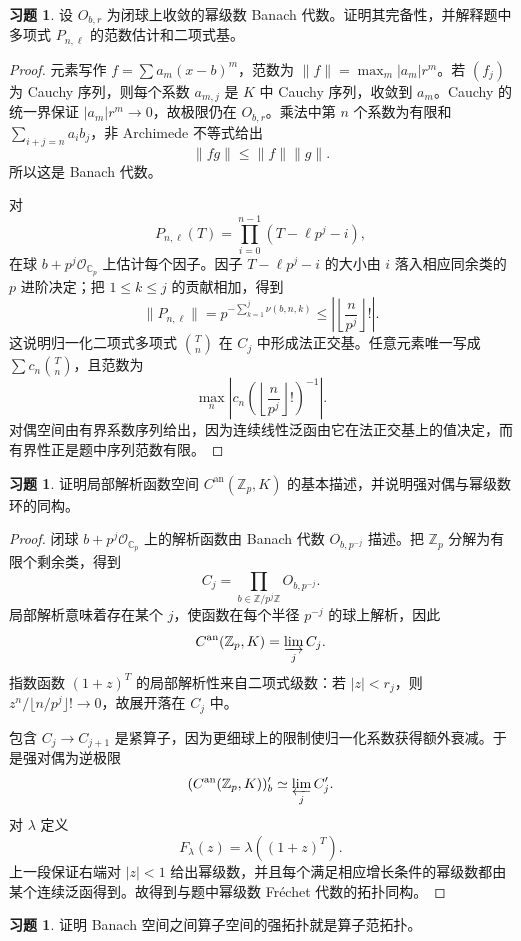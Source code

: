 \documentclass[11pt,a4paper,openany]{ctexbook}
\numberwithin{equation}{chapter}
\newcommand{\C}{\mathbb{C}}
\newcommand{\Z}{\mathbb{Z}}
\theoremstyle{plain}
\theoremstyle{definition}
\newtheorem{exercise}[theorem]{习题}
\theoremstyle{remark}
\begin{document}
\begin{exercise}
设 $O_{b,r}$ 为闭球上收敛的幂级数 Banach 代数。证明其完备性，并解释题中多项式 $P_{n,\ell}$ 的范数估计和二项式基。
\end{exercise}

\begin{proof}
元素写作 $f=\sum a_m(x-b)^m$，范数为 $\|f\|=\max_m |a_m|r^m$。若 $(f_j)$ 为 Cauchy 序列，则每个系数 $a_{m,j}$ 是 $K$ 中 Cauchy 序列，收敛到 $a_m$。Cauchy 的统一界保证 $|a_m|r^m\to0$，故极限仍在 $O_{b,r}$。乘法中第 $n$ 个系数为有限和 $\sum_{i+j=n}a_ib_j$，非 Archimede 不等式给出
\[
  \|fg\|\le\|f\|\|g\|.
\]
所以这是 Banach 代数。

对
\[
  P_{n,\ell}(T)=\prod_{i=0}^{n-1}(T-\ell p^j-i),
\]
在球 $b+p^j\mathcal O_{\C_p}$ 上估计每个因子。因子 $T-\ell p^j-i$ 的大小由 $i$ 落入相应同余类的 $p$ 进阶决定；把 $1\le k\le j$ 的贡献相加，得到
\[
  \|P_{n,\ell}\|=p^{-\sum_{k=1}^j\nu(b,n,k)}\le \left|\left\lfloor\frac{n}{p^j}\right\rfloor!\right|.
\]
这说明归一化二项式多项式 $\binom{T}{n}$ 在 $C_j$ 中形成法正交基。任意元素唯一写成 $\sum c_n\binom{T}{n}$，且范数为
\[
  \max_n\left|c_n\left(\left\lfloor\frac n{p^j}\right\rfloor!\right)^{-1}\right|.
\]
对偶空间由有界系数序列给出，因为连续线性泛函由它在法正交基上的值决定，而有界性正是题中序列范数有限。
\end{proof}

\begin{exercise}
证明局部解析函数空间 $C^{\mathrm{an}}(\Z_p,K)$ 的基本描述，并说明强对偶与幂级数环的同构。
\end{exercise}

\begin{proof}
闭球 $b+p^j\mathcal O_{\C_p}$ 上的解析函数由 Banach 代数 $O_{b,p^{-j}}$ 描述。把 $\Z_p$ 分解为有限个剩余类，得到
\[
  C_j=\prod_{b\in\Z/p^j\Z}O_{b,p^{-j}}.
\]
局部解析意味着存在某个 $j$，使函数在每个半径 $p^{-j}$ 的球上解析，因此
\[
  C^{\mathrm{an}}(\Z_p,K)=\varinjlim_j C_j.
\]
指数函数 $(1+z)^T$ 的局部解析性来自二项式级数：若 $|z|<r_j$，则 $z^n/\lfloor n/p^j\rfloor!\to0$，故展开落在 $C_j$ 中。

包含 $C_j\to C_{j+1}$ 是紧算子，因为更细球上的限制使归一化系数获得额外衰减。于是强对偶为逆极限
\[
  (C^{\mathrm{an}}(\Z_p,K))'_b\simeq \varprojlim_j C_j'.
\]
对 $\lambda$ 定义
\[
  F_\lambda(z)=\lambda((1+z)^T).
\]
上一段保证右端对 $|z|<1$ 给出幂级数，并且每个满足相应增长条件的幂级数都由某个连续泛函得到。故得到与题中幂级数 Fréchet 代数的拓扑同构。
\end{proof}

\begin{exercise}
证明 Banach 空间之间算子空间的强拓扑就是算子范拓扑。
\end{exercise}
\end{document}
